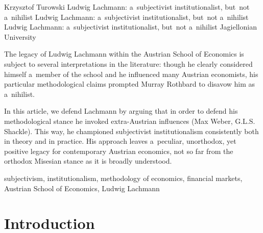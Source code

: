\begin{artengenv}{Krzysztof Turowski}
	{Ludwig Lachmann: a~subjectivist institutionalist, but~not a~nihilist}
	{Ludwig Lachmann: a~subjectivist institutionalist, but~not a~nihilist}
	{Ludwig Lachmann: a~subjectivist institutionalist, but~not a~nihilist}
	{Jagiellonian University\label{turowski-first}}
	{The legacy of Ludwig Lachmann within the Austrian School of Economics is subject to several interpretations in the literature: though he clearly considered himself a~member of the school and he influenced many Austrian economists, his particular methodological claims prompted Murray Rothbard to disavow him as a~nihilist.
	
	
	
	In this article, we defend Lachmann by arguing that in order to defend his methodological stance he invoked extra-Austrian influences (Max Weber, G.L.S. Shackle). This way, he championed subjectivist institutionalism consistently both in theory and in practice. His approach leaves a~peculiar, unorthodox, yet positive legacy for contemporary Austrian economics, not so far from the orthodox Misesian stance as it is broadly understood.
	}
	{subjectivism, institutionalism, methodology of economics, financial markets, Austrian School of Economics, Ludwig Lachmann}





\section{Introduction}


\end{artengenv}
